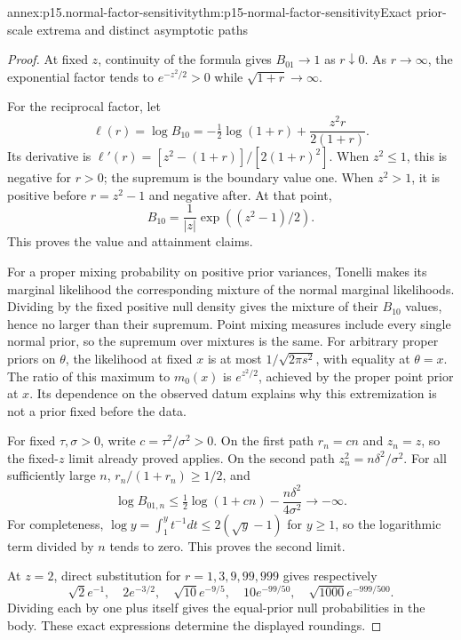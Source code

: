 \begin{annexitem}{annex:p15.normal-factor-sensitivity}{thm:p15-normal-factor-sensitivity}{Exact prior-scale extrema and distinct asymptotic paths}
\begin{proof}
At fixed \(z\), continuity of the formula gives \(B_{01}\to1\) as
\(r\downarrow0\). As \(r\to\infty\), the exponential factor tends
to \(e^{-z^2/2}>0\) while \(\sqrt{1+r}\to\infty\).

For the reciprocal factor, let
\[
 \ell(r)=\log B_{10}
 =-\tfrac12\log(1+r)+\frac{z^2r}{2(1+r)}.
\]
Its derivative is
\(\ell'(r)=[z^2-(1+r)]/[2(1+r)^2]\).
When \(z^2\leq1\), this is negative for \(r>0\); the supremum is
the boundary value one. When \(z^2>1\), it is positive before
\(r=z^2-1\) and negative after. At that point,
\[
 B_{10}=\frac1{|z|}\exp((z^2-1)/2).
\]
This proves the value and attainment claims.

For a proper mixing probability on positive prior variances, Tonelli
makes its marginal likelihood the corresponding mixture of the normal
marginal likelihoods. Dividing by the fixed positive null density gives
the mixture of their \(B_{10}\) values, hence no larger than their
supremum. Point mixing measures include every single normal prior, so
the supremum over mixtures is the same. For arbitrary proper priors
on \(\theta\), the likelihood at fixed \(x\) is at most
\(1/\sqrt{2\pi s^2}\), with equality at \(\theta=x\).
The ratio of this maximum to \(m_0(x)\) is \(e^{z^2/2}\), achieved by
the proper point prior at \(x\). Its dependence on the observed datum
explains why this extremization is not a prior fixed before the data.

For fixed \(\tau,\sigma>0\), write \(c=\tau^2/\sigma^2>0\).
On the first path \(r_n=cn\) and \(z_n=z\), so the fixed-\(z\)
limit already proved applies. On the second path
\(z_n^2=n\delta^2/\sigma^2\). For all sufficiently large \(n\),
\(r_n/(1+r_n)\geq1/2\), and
\[
 \log B_{01,n}
 \leq\tfrac12\log(1+cn)-\frac{n\delta^2}{4\sigma^2}\longrightarrow-\infty.
\]
For completeness, \(\log y=\int_1^y t^{-1}dt\leq2(\sqrt y-1)\)
for \(y\geq1\), so the logarithmic term divided by \(n\) tends to zero.
This proves the second limit.

At \(z=2\), direct substitution for \(r=1,3,9,99,999\) gives respectively
\[
 \sqrt2e^{-1},\quad2e^{-3/2},\quad
 \sqrt{10}e^{-9/5},\quad10e^{-99/50},\quad
 \sqrt{1000}e^{-999/500}.
\]
Dividing each by one plus itself gives the equal-prior null probabilities
in the body. These exact expressions determine the displayed roundings.
\end{proof}
\end{annexitem}

